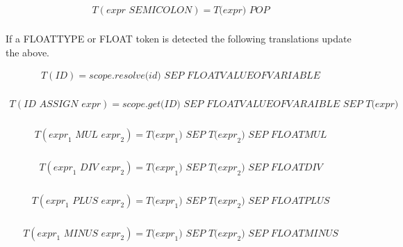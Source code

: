 \documentclass[a4paper,12pt]{article}
\begin{document}
\begin{landscape}
\begin{equation} 
\begin{aligned}
    T( \textit{expr SEMICOLON})
    = \textit{T(expr) POP} \\
\end{aligned}
\end{equation}

If a FLOATTYPE or FLOAT token is detected the following translations update the above.

\begin{equation} 
\begin{aligned}
    T( \textit{ID})
    = \textit{scope.resolve(id) SEP FLOATVALUEOFVARIABLE}\\
\end{aligned}
\end{equation}

\begin{equation} 
\begin{aligned}
    T( \textit{ID ASSIGN expr})
    = \textit{scope.get(ID) SEP FLOATVALUEOFVARAIBLE SEP T(expr)}\\
\end{aligned}
\end{equation}

\begin{equation} 
\begin{aligned}
    T( \textit{expr}_{1} \textit{ MUL expr}_{2})
    = \textit{T(expr}_{1} \textit{) SEP T(expr}_{2} \textit{) SEP FLOATMUL}\\
\end{aligned}
\end{equation}

\begin{equation} 
\begin{aligned}
    T( \textit{expr}_{1} \textit{ DIV expr}_{2})
    = \textit{T(expr}_{1} \textit{) SEP T(expr}_{2} \textit{) SEP FLOATDIV}\\
\end{aligned}
\end{equation}

\begin{equation} 
\begin{aligned}
    T( \textit{expr}_{1} \textit{ PLUS expr}_{2})
    = \textit{T(expr}_{1} \textit{) SEP T(expr}_{2} \textit{) SEP FLOATPLUS}\\
\end{aligned}
\end{equation}

\begin{equation} 
\begin{aligned}
    T( \textit{expr}_{1} \textit{ MINUS expr}_{2})
    = \textit{T(expr}_{1} \textit{) SEP T(expr}_{2} \textit{) SEP FLOATMINUS}\\
\end{aligned}
\end{equation}


\end{landscape}
\end{document}

